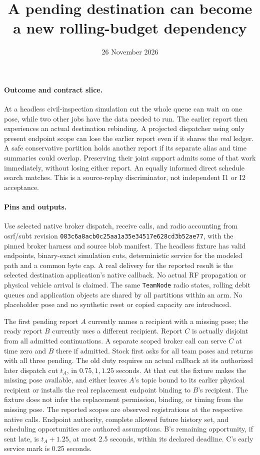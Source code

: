 \documentclass{article}
\title{A pending destination can become a new rolling-budget dependency}
\date{26 November 2026}
\begin{document}
\maketitle
\paragraph{Outcome and contract slice.}
At a headless civil-inspection simulation cut the whole queue can wait
on one pose, while two other jobs have the data needed to run.
The earlier report then experiences an actual destination rebinding.
A projected dispatcher using only present endpoint scope can lose the
earlier report even if it shares the \emph{real} ledger. A safe
conservative partition holds another report if its separate alias
and time summaries could overlap. Preserving their joint support
admits some of that work immediately, without losing either report.
An equally informed direct schedule search matches. This is a
source-replay discriminator, not independent I1 or I2 acceptance.

\paragraph{Pins and outputs.}
Use selected native broker dispatch, receive calls, and radio
accounting from osrf/subt revision
\texttt{083c6a8acb0c25aa1a35e34517e628cd3b52ae77}, with the pinned
broker harness and source blob manifest. The headless fixture has
valid endpoints, binary-exact simulation cuts, deterministic service
for the modeled path and a common byte cap. A real
delivery for the reported result is the selected destination
application's native callback. No actual RF propagation or physical
vehicle arrival is claimed. The same \texttt{TeamNode} radio states,
rolling debit queues and application objects are shared by all
partitions within an arm. No placeholder pose and no synthetic reset
or copied capacity are introduced.

The first pending report \(A\) currently names a recipient with a
missing pose; the ready report \(B\) currently uses a different
recipient. Report \(C\) is actually disjoint from all admitted
continuations. A separate scoped broker call can serve \(C\)
at time zero and \(B\) there if admitted. Stock first asks for
all team poses and returns with all three pending. The old duty
requires an actual callback at its authorized later dispatch cut
\(t_A\), in \(0.75,1,1.25\) seconds. At that cut the fixture makes
the missing pose available, and either leaves \(A\)'s topic bound
to its earlier physical recipient or installs the real replacement
endpoint binding to \(B\)'s recipient. The fixture does not infer the
replacement permission, binding, or timing from the missing pose.
The reported scopes are observed registrations at the respective
native calls. Endpoint authority, complete allowed future history
set, and scheduling opportunities are authored assumptions.
B's remaining opportunity, if sent late, is \(t_A+1.25\), at most
2.5 seconds, within its declared deadline. C's early service mark
is 0.25 seconds.
\end{document}
